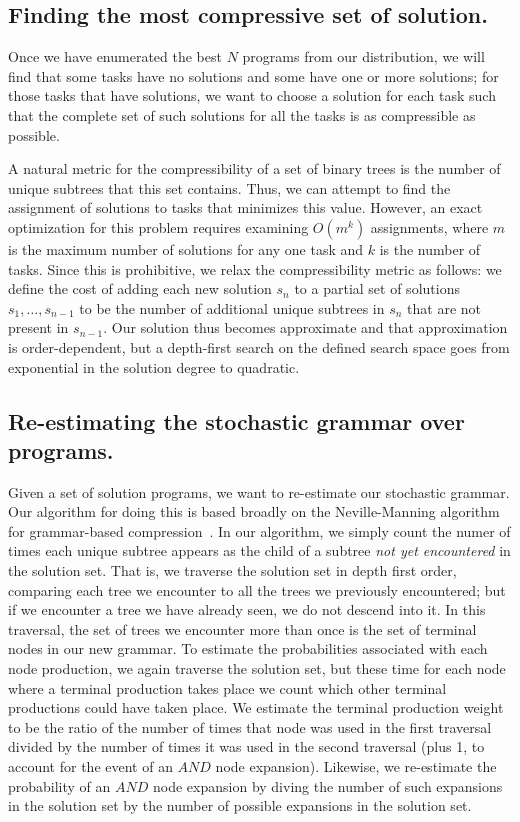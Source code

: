 \documentclass{article}
\begin{document}
\subsection{Finding the most compressive set of solution.}

Once we have enumerated the best $N$ programs from our distribution,
we will find that some tasks have no solutions and some have one or
more solutions; for those tasks that have solutions, we want to choose
a solution for each task such that the complete set of such solutions
for all the tasks is as compressible as possible.

A natural metric for the compressibility of a set of binary trees is
the number of unique subtrees that this set contains. Thus, we can
attempt to find the assignment of solutions to tasks that minimizes
this value. However, an exact optimization for this problem requires
examining $O(m^k)$ assignments, where $m$ is the maximum number of
solutions for any one task and $k$ is the number of tasks. Since this
is prohibitive, we relax the compressibility metric as follows: we
define the cost of adding each new solution $s_n$ to a partial set of
solutions $s_1, \dots, s_{n-1}$ to be the number of additional unique
subtrees in $s_n$ that are not present in $s_{n-1}$. Our solution thus
becomes approximate and that approximation is order-dependent, but a
depth-first search on the defined search space goes from exponential
in the solution degree to quadratic.

\subsection{Re-estimating the stochastic grammar over programs.}

Given a set of solution programs, we want to re-estimate our
stochastic grammar. Our algorithm for doing this is based broadly on
the Neville-Manning algorithm for grammar-based
compression~\cite{nevill1997identifying}. In our algorithm, we simply
count the numer of times each unique subtree appears as the child of a
subtree \emph{not yet encountered} in the solution set. That is, we
traverse the solution set in depth first order, comparing each tree we
encounter to all the trees we previously encountered; but if we
encounter a tree we have already seen, we do not descend into it. In
this traversal, the set of trees we encounter more than once is the
set of terminal nodes in our new grammar. To estimate the
probabilities associated with each node production, we again traverse
the solution set, but these time for each node where a terminal
production takes place we count which other terminal productions could
have taken place. We estimate the terminal production weight to be the
ratio of the number of times that node was used in the first traversal
divided by the number of times it was used in the second traversal
(plus 1, to account for the event of an $AND$ node
expansion). Likewise, we re-estimate the probability of an $AND$ node
expansion by diving the number of such expansions in the solution set
by the number of possible expansions in the solution set.
\end{document}
